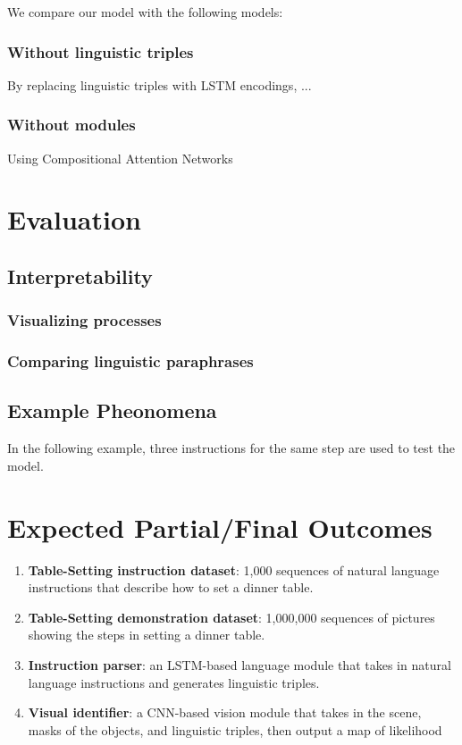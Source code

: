 \documentclass[conference]{IEEEtran}
\newenvironment{towrite}%
  {\begin{mdframed}[backgroundcolor=lightgray,
  					topline=false,
  					rightline=false,
  					leftline=false,
  					bottomline=false
  					]\smallskip}%
  {\smallskip\end{mdframed}}
\begin{document}
\begin{towrite}
We compare our model with the following models:

\subsubsection{Without linguistic triples}
By replacing linguistic triples with LSTM encodings, ...

\subsubsection{Without modules}
Using Compositional Attention Networks \cite{hudson2018compositional}
	
\section{Evaluation}

\subsection{Interpretability}

\subsubsection{Visualizing processes}

\subsubsection{Comparing linguistic paraphrases}

\subsection{Example Pheonomena}

In the following example, three instructions for the same step are used to test the model.


\end{towrite}



\section{Expected Partial/Final Outcomes}

\begin{enumerate}
	\item \textbf{Table-Setting instruction dataset}: 1,000 sequences of natural language instructions that describe how to set a dinner table.
	\item \textbf{Table-Setting demonstration dataset}: 1,000,000 sequences of pictures showing the steps in setting a dinner table.
	\item \textbf{Instruction parser}: an LSTM-based language module that takes in natural language instructions and generates linguistic triples.
	\item \textbf{Visual identifier}: a CNN-based vision module that takes in the scene, masks of the objects, and linguistic triples, then output a map of likelihood 
	\end{enumerate}
\end{document}
